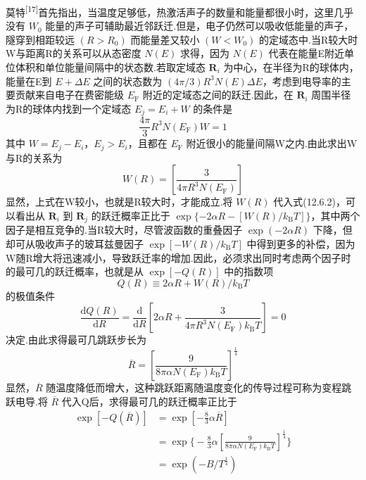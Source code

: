 莫特\textsuperscript{[17]}首先指出，当温度足够低，热激活声子的数量和能量都很小时，这里几乎没有 $W_{0}$ 能量的声子可辅助最近邻跃迁.但是，电子仍然可以吸收低能量的声子，隧穿到相距较远 $\left(R>R_{0}\right)$ 而能量差又较小 $\left(W<W_{0}\right)$ 的定域态中.当R较大时W与距离R的关系可以从态密度 $N\left(E\right)$ 求得，因为 $N\left(E\right)$ 代表在能量E附近单位体积和单位能量间隔中的状态数.若取定域态 $\boldsymbol{R}_{i}$ 为中心，在半径为R的球体内，能量在E到 $E+\Delta E$ 之间的状态数为 $\left(4\pi/3\right)R^{3}N\left(E\right)\Delta E$，考虑到电导率的主要贡献来自电子在费密能级 $E_{\mathrm{F}}$ 附近的定域态之间的跃迁.因此，在 $\boldsymbol{R}_{i}$ 周围半径为R的球体内找到一个定域态 $E_{j}=E_{i}+W$ 的条件是
\begin{equation}
  \frac{4\pi}{3}R^{3}N\left(E_{\mathrm{F}}\right)W=1
\end{equation}
其中 $W=E_{j}-E_{i}$，$E_{j}>E_{i}$，且都在 $E_{\mathrm{F}}$ 附近很小的能量间隔W之内.由此求出W与R的关系为
\begin{equation}
  W\left(R\right)=\left[\frac{3}{4\pi R^{3}N\left(E_{\mathrm{F}}\right)}\right]
\end{equation}
显然，上式在W较小，也就是R较大时，才能成立.将 $W\left(R\right)$ 代入式(12.6.2)，可以看出从 $\boldsymbol{R}_{i}$ 到 $\boldsymbol{R}_{j}$ 的跃迁概率正比于 $\exp\{-2\alpha R-\left[W\left(R\right)/k_{\mathrm{B}}T\right]\}$，其中两个因子是相互竞争的.当R较大时，尽管波函数的重叠因子 $\exp\left(-2\alpha R\right)$ 下降，但却可从吸收声子的玻耳兹曼因子 $\exp\left[-W\left(R\right)/k_{\mathrm{B}}T\right]$ 中得到更多的补偿，因为W随R增大将迅速减小，导致跃迁率的增加.因此，必须求出同时考虑两个因子时的最可几的跃迁概率，也就是从 $\exp\left[-Q\left(R\right)\right]$ 中的指数项
\begin{equation}
  Q\left(R\right)\equiv 2\alpha R+W\left(R\right)/k_{\mathrm{B}}T
\end{equation}
的极值条件
\begin{equation}
  \frac{\mathrm{d}Q\left(R\right)}{\mathrm{d}R}
  =\frac{\mathrm{d}}{\mathrm{d}R}\left[2\alpha R
  +\frac{3}{4\pi R^{3}N\left(E_{\mathrm{F}}\right)k_{\mathrm{B}}T}\right]=0
\end{equation}
决定.由此求得最可几跳跃步长为
\begin{equation}
  \overline{R}=\left[\frac{9}{8\pi\alpha N\left(E_{\mathrm{F}}\right)k_{\mathrm{B}}T}\right]^{\frac{1}{4}}
\end{equation}
显然，$\overline{R}$ 随温度降低而增大，这种跳跃距离随温度变化的传导过程可称为变程跳跃电导.将 $\overline{R}$ 代入Q后，求得最可几的跃迁概率正比于
\begin{equation}
\begin{aligned}
  \exp\left[-Q\left(\overline{R}\right)\right]
  &=\exp\left[-\frac{8}{3}\alpha\overline{R}\right]\\
  &=\exp\Biggl\{-\frac{8}{3}\alpha
  \left[\frac{9}{8\pi\alpha N\left(E_{\mathrm{F}}\right)k_{\mathrm{B}}T}\right]^{\frac{1}{4}}\Biggr\}\\
  &=\exp\left(-B/T^{\frac{1}{4}}\right)
\end{aligned}
\end{equation}
